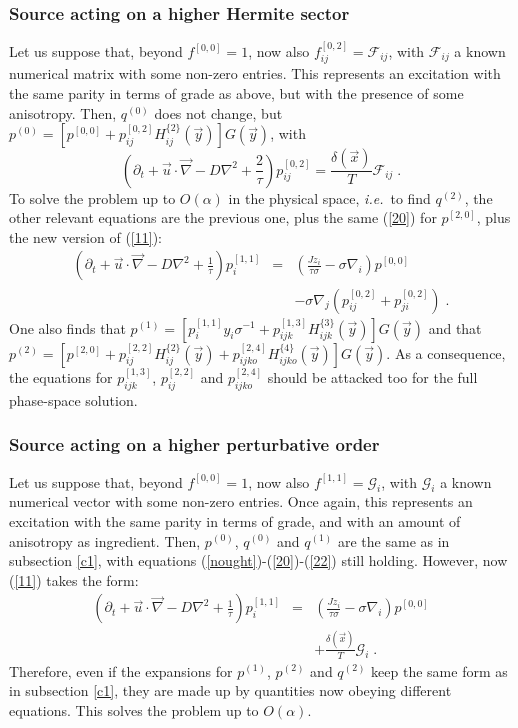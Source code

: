 \subsubsection{Source acting on a higher Hermite sector} \label{c1h}
%
Let us suppose that, beyond $f^{[0,0]}=1$, now also $f^{[0,2]}_{ij}=\mathcal{F}_{ij}$, with $\mathcal{F}_{ij}$ a known numerical matrix
with some non-zero entries. This represents an excitation with the same parity in terms of grade as above, but with the presence of some anisotropy.
Then, $q^{(0)}$ does not change, but $p^{(0)}=[p^{[0,0]}+p^{[0,2]}_{ij}H^{\{2\}}_{ij}(\vec{y})]G(\vec{y})$, with
\[\left(\partial_t+\vec{u}\cdot\vec{\nabla}-D\nabla^2+\frac{2}{\tau}\right)p^{[0,2]}_{ij}=\frac{\delta(\vec{x})}{T}\mathcal{F}_{ij}\;.\]
To solve the problem up to $O(\alpha)$ in the physical space, \emph{i.e.}\ to find $q^{(2)}$,
the other relevant equations are the previous one, plus the same (\ref{20}) for $p^{[2,0]}$, plus the new version of (\ref{11}):
\begin{eqnarray*}
 \left(\partial_t+\vec{u}\cdot\vec{\nabla}-D\nabla^2+\frac{1}{\tau}\right)p^{[1,1]}_i&=&\left(\frac{Jz_i}{\tau\sigma}-\sigma\nabla_i\right)p^{[0,0]}\\
 &&-\sigma\nabla_j(p^{[0,2]}_{ij}+p^{[0,2]}_{ji})\;.
\end{eqnarray*}
One also finds that $p^{(1)}=[p^{[1,1]}_iy_i\sigma^{-1}+p^{[1,3]}_{ijk}H^{\{3\}}_{ijk}(\vec{y})]G(\vec{y})$
and that $p^{(2)}=[p^{[2,0]}+p^{[2,2]}_{ij}H^{\{2\}}_{ij}(\vec{y})+p^{[2,4]}_{ijko}H^{\{4\}}_{ijko}(\vec{y})]G(\vec{y})$.
As a consequence, the equations for $p^{[1,3]}_{ijk}$, $p^{[2,2]}_{ij}$ and $p^{[2,4]}_{ijko}$ should be attacked too for the full phase-space solution.
%
\subsubsection{Source acting on a higher perturbative order} \label{c1p}
%
Let us suppose that, beyond $f^{[0,0]}=1$, now also $f^{[1,1]}=\mathcal{G}_i$, with $\mathcal{G}_i$ a known numerical vector with some non-zero entries.
Once again, this represents an excitation with the same parity in terms of grade, and with an amount of anisotropy as ingredient.
Then, $p^{(0)}$, $q^{(0)}$ and $q^{(1)}$ are the same as in subsection \ref{c1}, with equations (\ref{nought})-(\ref{20})-(\ref{22}) still holding.
However, now (\ref{11}) takes the form:
\begin{eqnarray*}
 \left(\partial_t+\vec{u}\cdot\vec{\nabla}-D\nabla^2+\frac{1}{\tau}\right)p^{[1,1]}_i&=&\left(\frac{Jz_i}{\tau\sigma}-\sigma\nabla_i\right)p^{[0,0]}\\
 &&+\frac{\delta(\vec{x})}{T}\mathcal{G}_i\;.
\end{eqnarray*}
Therefore, even if the expansions for $p^{(1)}$, $p^{(2)}$ and $q^{(2)}$ keep the same form as in subsection \ref{c1}, they are made up by quantities
now obeying different equations. This solves the problem up to $O(\alpha)$.
%
